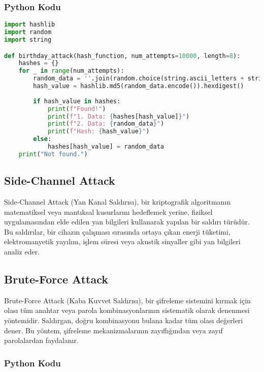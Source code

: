 \subsubsection{Python Kodu}

\begin{lstlisting}[language=Python]
import hashlib
import random
import string

def birthday_attack(hash_function, num_attempts=10000, length=8):
    hashes = {}
    for _ in range(num_attempts):
        random_data = ''.join(random.choice(string.ascii_letters + string.digits) for _ in range(length))
        hash_value = hashlib.md5(random_data.encode()).hexdigest()
        
        if hash_value in hashes:
            print(f"Found!")
            print(f"1. Data: {hashes[hash_value]}")
            print(f"2. Data: {random_data}")
            print(f"Hash: {hash_value}")
        else:
            hashes[hash_value] = random_data
    print("Not found.")
\end{lstlisting}

\newpage

\subsection{Side-Channel Attack}

Side-Channel Attack (Yan Kanal Saldırısı), bir kriptografik algoritmanın matematiksel veya mantıksal kusurlarını hedeflemek yerine, fiziksel uygulamasından elde edilen yan bilgileri kullanarak yapılan bir saldırı türüdür. Bu saldırılar, bir cihazın çalışması sırasında ortaya çıkan enerji tüketimi, elektromanyetik yayılım, işlem süresi veya akustik sinyaller gibi yan bilgileri analiz eder.

\newpage

\subsection{Brute-Force Attack}

Brute-Force Attack (Kaba Kuvvet Saldırısı), bir şifreleme sistemini kırmak için olası tüm anahtar veya parola kombinasyonlarının sistematik olarak denenmesi yöntemidir. Saldırgan, doğru kombinasyonu bulana kadar tüm olası değerleri dener. Bu yöntem, şifreleme mekanizmalarının zayıflığından veya zayıf parolalardan faydalanır.

\subsubsection{Python Kodu}

